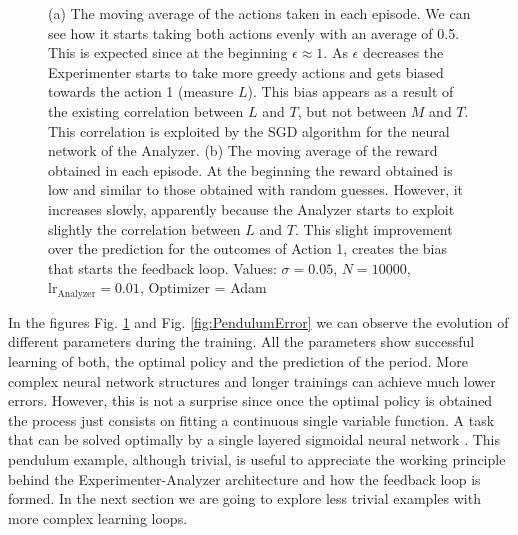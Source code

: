 \documentclass[11pt,a4paper,twoside]{report}
\newcommand{\+}{\textnormal{+} }
\theoremstyle{definition}
\numberwithin{equation}{chapter}
\begin{document}
\begin{figure}[h]
  \caption{(a) The moving average of the actions taken in each episode. We can
  see how it starts taking both actions evenly with an average of 0.5. This is
  expected since at the beginning $\epsilon \approx 1$. As $\epsilon$ decreases
  the Experimenter starts to take more greedy actions and gets biased towards
  the action 1 (measure $L$). This bias appears as a result of the existing
  correlation between $L$ and $T$, but not between $M$ and $T$. This correlation
  is exploited by the SGD algorithm for the neural network of the Analyzer. (b)
  The moving average of the reward obtained in each episode. At the beginning
  the reward obtained is low and similar to those obtained with random guesses.
  However, it increases slowly, apparently because the Analyzer starts to
  exploit slightly the correlation between $L$ and $T$. This slight improvement
  over the prediction for the outcomes of Action 1, creates the bias that starts
  the feedback loop. Values: $\sigma=0.05$, $N=10000$,
  $\text{lr}_\text{Analyzer}=0.01$, Optimizer = Adam}
  \label{fig:PendulumTraining}
  \end{figure}

  In the figures Fig. \ref{fig:PendulumTraining} and Fig.
  \ref{fig:PendulumError} we can observe the evolution of different parameters
  during the training. All the parameters show successful learning of both, the
  optimal policy and the prediction of the period. More complex neural network
  structures and longer trainings can achieve much lower errors. However, this
  is not a surprise since once the optimal policy is obtained the process just
  consists on fitting a continuous single variable function. A task that can be
  solved optimally by a single layered sigmoidal neural network
  \cite{cybenko1989approximation}. This pendulum example, although trivial, is
  useful to appreciate the working principle behind the Experimenter-Analyzer
  architecture and how the feedback loop is formed. In the next section we are
  going to explore less trivial examples with more complex learning loops.
\end{document}
